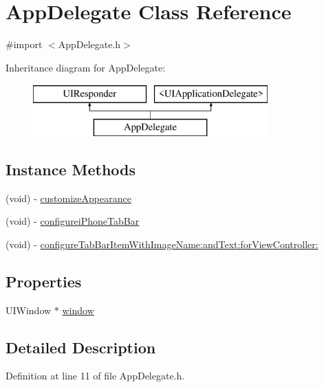 \hypertarget{interface_app_delegate}{\section{App\-Delegate Class Reference}
\label{interface_app_delegate}
}


{\ttfamily \#import $<$App\-Delegate.\-h$>$}

Inheritance diagram for App\-Delegate\-:\begin{figure}[H]
\begin{center}
\leavevmode
\includegraphics[height=2.000000cm]{interface_app_delegate}
\end{center}
\end{figure}
\subsection*{Instance Methods}
\begin{DoxyCompactItemize}
\item 
(void) -\/ \hyperlink{interface_app_delegate_ad27c9256d88b1c8373b864132a4bf924}{customize\-Appearance}
\item 
(void) -\/ \hyperlink{interface_app_delegate_a50781acf77270e0648c6a42790367a61}{configurei\-Phone\-Tab\-Bar}
\item 
(void) -\/ \hyperlink{interface_app_delegate_ad7cb8ab6bc9d8a6f07e1a1f872b3d41d}{configure\-Tab\-Bar\-Item\-With\-Image\-Name\-:and\-Text\-:for\-View\-Controller\-:}
\end{DoxyCompactItemize}
\subsection*{Properties}
\begin{DoxyCompactItemize}
\item 
U\-I\-Window $\ast$ \hyperlink{interface_app_delegate_acf48ac24125e688cac1a85445cd7fac2}{window}
\end{DoxyCompactItemize}


\subsection{Detailed Description}


Definition at line 11 of file App\-Delegate.\-h.




